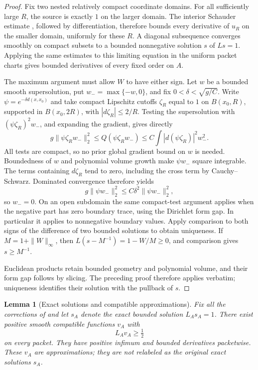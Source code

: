 \documentclass[11pt]{article}
\numberwithin{equation}{section}
\newtheorem{lemma}[theorem]{Lemma}
\theoremstyle{definition}
\theoremstyle{remark}
\begin{document}
\begin{proof}
Fix two nested relatively compact coordinate domains.  For all
sufficiently large $R$, the source is exactly $1$ on the larger domain.
The interior Schauder estimate
\citep[Lecture~12, Theorem~2]{simonPDE}, followed by differentiation,
therefore bounds every derivative of $u_R$ on the smaller domain,
uniformly for these $R$.  A diagonal subsequence converges smoothly
on compact subsets to a bounded nonnegative solution $s$ of $Ls=1$.
Applying the same estimates to this limiting equation in the uniform
packet charts gives bounded derivatives of every fixed order on $A$.

The maximum argument must allow $W$ to have either sign.  Let $w$ be
a bounded smooth supersolution, put $w_-=\max\{-w,0\}$, and fix
$0<\delta<\sqrt{g/C}$.  Write
$\psi=e^{-\delta d(x,x_0)}$ and take compact Lipschitz cutoffs
$\zeta_R$ equal to $1$ on $B(x_0,R)$, supported in $B(x_0,2R)$,
with $|d\zeta_R|\le 2/R$.  Testing the supersolution with
$(\psi\zeta_R)^2w_-$, and expanding the gradient, gives directly
\[
 g\|\psi\zeta_R w_-\|_2^2
 \le Q(\psi\zeta_R w_-)
 \le C\int |d(\psi\zeta_R)|^2w_-^2.
\]
All tests are compact, so no prior global gradient bound on $w$ is
needed.  Boundedness of $w$ and polynomial volume growth make
$\psi w_-$ square integrable.  The terms containing $d\zeta_R$ tend
to zero, including the cross term by Cauchy--Schwarz.  Dominated
convergence therefore yields
\[
 g\|\psi w_-\|_2^2\le C\delta^2\|\psi w_-\|_2^2,
\]
so $w_-=0$.  On an open subdomain the same compact-test argument
applies when the negative part has zero boundary trace, using the
Dirichlet form gap.  In particular it applies to nonnegative boundary
values.  Apply comparison to both signs of the difference of two
bounded solutions to obtain uniqueness.  If $M=1+\|W\|_\infty$, then
$L(s-M^{-1})=1-W/M\ge0$, and comparison gives $s\ge M^{-1}$.

Euclidean products retain bounded geometry and polynomial volume,
and their form gap follows by slicing.  The preceding proof therefore
applies verbatim; uniqueness identifies their solution with the
pullback of $s$.
\end{proof}

\begin{lemma}[Exact solutions and compatible approximations]\label{regular:solutions}
Fix \emph{all} the corrections of  and let
$s_A$ denote the exact bounded solution $L_As_A=1$.  There exist
positive smooth compatible functions $v_A$ with
\begin{equation}\label{regular:strict-supersolution}
 L_Av_A\ge\tfrac12
\end{equation}
on every packet.  They have positive infimum and bounded derivatives
packetwise.  These $v_A$ are approximations; they are not relabeled as
the original exact solutions $s_A$.
\end{lemma}
\end{document}
